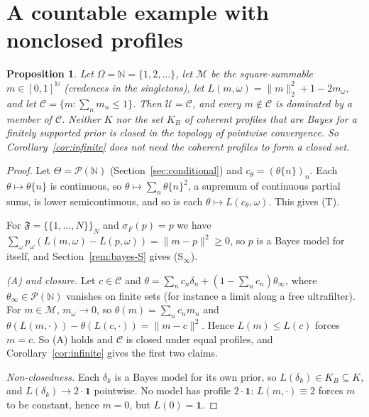 \documentclass[11pt]{article}
\newtheorem{proposition}[theorem]{Proposition}
\theoremstyle{definition}
\theoremstyle{remark}
\newcommand{\M}{\mathcal M}
\newcommand{\C}{\mathcal C}
\newcommand{\F}{\mathfrak F}
\newcommand{\U}{\mathcal U}
\newcommand{\PP}{\mathcal P}
\newcommand{\one}{\mathbf 1}
\begin{document}
\section{A countable example with nonclosed profiles}\label{sec:countable}
\begin{proposition}\label{prop:countable}
Let $\Omega=\mathbb N=\{1,2,\dots\}$, let $\M$ be the square-summable $m\in[0,1]^{\mathbb N}$ (credences in the singletons), let $L(m,\omega)=\|m\|_2^2+1-2m_\omega$, and let $\C=\{m:\sum_nm_n\le1\}$. Then $\U=\C$, and every $m\notin\C$ is dominated by a member of $\C$. Neither $K$ nor the set $K_B$ of coherent profiles that are Bayes for a finitely supported prior is closed in the topology of pointwise convergence. So Corollary~\ref{cor:infinite} does not need the coherent profiles to form a closed set.
\end{proposition}
\begin{proof}
Let $\Theta=\PP(\mathbb N)$ (Section~\ref{sec:conditional}) and $c_\theta=(\theta\{n\})_n$. Each $\theta\mapsto\theta\{n\}$ is continuous, so $\theta\mapsto\sum_n\theta\{n\}^2$, a supremum of continuous partial sums, is lower semicontinuous, and so is each $\theta\mapsto L(c_\theta,\omega)$. This gives (T).

For $\F=\{\{1,\dots,N\}\}_N$ and $\sigma_F(p)=p$ we have $\sum_\omega p_\omega(L(m,\omega)-L(p,\omega))=\|m-p\|^2\ge0$, so $p$ is a Bayes model for itself, and Section~\ref{rem:bayes-S} gives (S$_\infty$).

\emph{(A) and closure.} Let $c\in\C$ and $\theta=\sum_nc_n\delta_n+(1-\sum_nc_n)\theta_\infty$, where $\theta_\infty\in\PP(\mathbb N)$ vanishes on finite sets (for instance a limit along a free ultrafilter). For $m\in\M$, $m_\omega\to0$, so $\theta(m)=\sum_nc_nm_n$ and $\theta(L(m,\cdot))-\theta(L(c,\cdot))=\|m-c\|^2$. Hence $L(m)\le L(c)$ forces $m=c$. So (A) holds and $\C$ is closed under equal profiles, and Corollary~\ref{cor:infinite} gives the first two claims.

\emph{Non-closedness.} Each $\delta_k$ is a Bayes model for its own prior, so $L(\delta_k)\in K_B\subseteq K$, and $L(\delta_k)\to2\cdot\one$ pointwise. No model has profile $2\cdot\one$: $L(m,\cdot)\equiv2$ forces $m$ to be constant, hence $m=0$, but $L(0)=\one$.
\end{proof}
\end{document}
